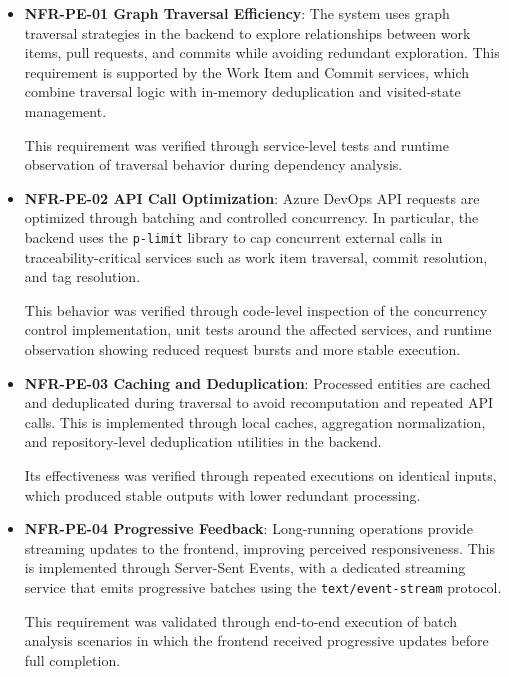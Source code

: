 \begin{itemize}

\item \textbf{NFR-PE-01  Graph Traversal Efficiency}:  
The system uses graph traversal strategies in the backend to explore relationships between work items, pull requests, and commits while avoiding redundant exploration. This requirement is supported by the Work Item and Commit services, which combine traversal logic with in-memory deduplication and visited-state management.

This requirement was verified through service-level tests and runtime observation of traversal behavior during dependency analysis.

\item \textbf{NFR-PE-02  API Call Optimization}:  
Azure DevOps API requests are optimized through batching and controlled concurrency. In particular, the backend uses the \texttt{p-limit} library to cap concurrent external calls in traceability-critical services such as work item traversal, commit resolution, and tag resolution.

This behavior was verified through code-level inspection of the concurrency control implementation, unit tests around the affected services, and runtime observation showing reduced request bursts and more stable execution.

\item \textbf{NFR-PE-03  Caching and Deduplication}:  
Processed entities are cached and deduplicated during traversal to avoid recomputation and repeated API calls. This is implemented through local caches, aggregation normalization, and repository-level deduplication utilities in the backend.

Its effectiveness was verified through repeated executions on identical inputs, which produced stable outputs with lower redundant processing.

\item \textbf{NFR-PE-04  Progressive Feedback}:  
Long-running operations provide streaming updates to the frontend, improving perceived responsiveness. This is implemented through Server-Sent Events, with a dedicated streaming service that emits progressive batches using the \texttt{text/event-stream} protocol.

This requirement was validated through end-to-end execution of batch analysis scenarios in which the frontend received progressive updates before full completion.

\end{itemize}

